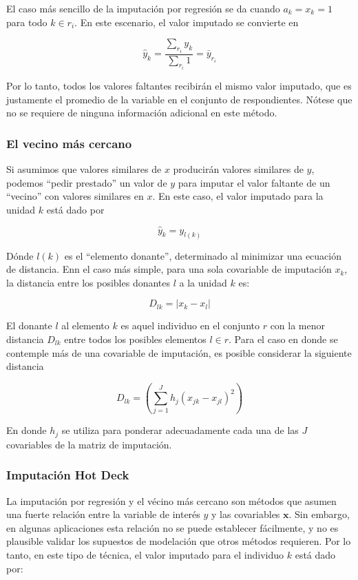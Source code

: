 El caso más sencillo de la imputación por regresión se da cuando \(a_k = x_k = 1\) para todo \(k \in r_i\). En este escenario, el valor imputado se convierte en

\[\hat{y}_k  = \frac{\sum_{r_i}y_k}{\sum_{r_i}1}= \bar{y}_{r_i}\]

Por lo tanto, todos los valores faltantes recibirán el mismo valor imputado, que es justamente el promedio de la variable en el conjunto de respondientes. Nótese que no se requiere de ninguna información adicional en este método.

\hypertarget{el-vecino-mas-cercano}{%
\subsubsection*{El vecino más cercano}\label{el-vecino-mas-cercano}}


Si asumimos que valores similares de \(x\) producirán valores similares de \(y\), podemos ``pedir prestado'' un valor de \(y\) para imputar el valor faltante de un ``vecino'' con valores similares en \(x\). En este caso, el valor imputado para la unidad \(k\) está dado por

\[\hat{y}_k = y_{l(k)}\]

Dónde \(l(k)\) es el ``elemento donante'', determinado al minimizar una ecuación de distancia. Enn el caso más simple, para una sola covariable de imputación \(x_k\), la distancia entre los posibles donantes \(l\) a la unidad \(k\) es:

\[
D_{lk} = |x_k - x_l|
\]

El donante \(l\) al elemento \(k\) es aquel individuo en el conjunto \(r\) con la menor distancia \(D_{lk}\) entre todos los posibles elementos \(l\in r\). Para el caso en donde se contemple más de una covariable de imputación, es posible considerar la siguiente distancia

\[
D_{lk} = \left( \sum_{j=1}^J h_j (x_{jk} - x_{jl})^2 \right)
\]

En donde \(h_j\) se utiliza para ponderar adecuadamente cada una de las \(J\) covariables de la matriz de imputación.

\hypertarget{imputacion-hot-deck}{%
\subsubsection*{Imputación Hot Deck}\label{imputacion-hot-deck}}


La imputación por regresión y el vécino más cercano son métodos que asumen una fuerte relación entre la variable de interés \(y\) y las covariables \(\mathbf{x}\). Sin embargo, en algunas aplicaciones esta relación no se puede establecer fácilmente, y no es plausible validar los supuestos de modelación que otros métodos requieren. Por lo tanto, en este tipo de técnica, el valor imputado para el individuo \(k\) está dado por:

